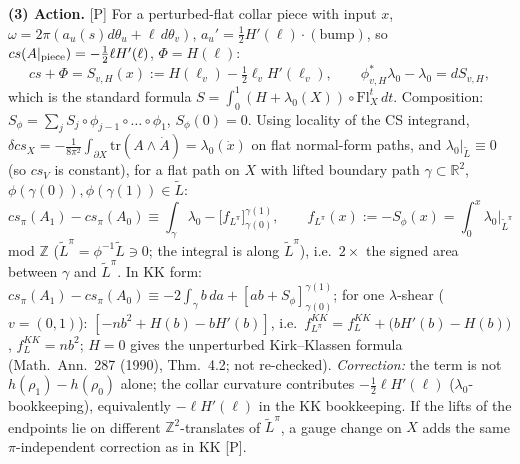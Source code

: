 \smallskip\noindent\textbf{(3) Action.} [P] For a perturbed-flat collar piece with input $x$,
$\omega=2\pi(a_u(s)d\theta_u+\ell\,d\theta_v)$, $a_u'=\frac12H'(\ell)\cdot(\text{bump})$, so
$cs(A|_{\rm piece})=-\frac12\ell H'(\ell)$, $\Phi=H(\ell)$:
\begin{equation}\label{collar:S}
cs+\Phi=S_{v,H}(x):=H(\ell_v)-\tfrac12\ell_vH'(\ell_v),\qquad \phi_{v,H}^*\lambda_0-\lambda_0=dS_{v,H},
\end{equation}
which is the standard formula $S=\int_0^1(H+\lambda_0(X))\circ\mathrm{Fl}^t_X\,dt$. Composition:
$S_\phi=\sum_jS_j\circ\phi_{j-1}\circ\dots\circ\phi_1$, $S_\phi(0)=0$. Using locality of the CS integrand,
$\delta cs_X=-\frac1{8\pi^2}\int_{\partial X}\mathrm{tr}(A\wedge\dot A)=\lambda_0(\dot x)$ on flat normal-form paths, and
$\lambda_0|_{\tilde L}\equiv0$ (so $cs_V$ is constant), for a flat path on $X$ with lifted boundary path
$\gamma\subset\mathbb R^2$, $\phi(\gamma(0)),\phi(\gamma(1))\in\tilde L$:
\begin{equation}\label{collar:action}
cs_\pi(A_1)-cs_\pi(A_0)\equiv\int_\gamma\lambda_0-\bigl[f_{L^\pi}\bigr]_{\gamma(0)}^{\gamma(1)},\qquad
f_{L^\pi}(x):=-S_\phi(x)=\int_{0}^{x}\lambda_0\big|_{\tilde L^\pi}
\end{equation}
mod $\mathbb Z$ ($\tilde L^\pi=\phi^{-1}\tilde L\ni0$; the integral is along $\tilde L^\pi$), i.e.\ $2\times$ the signed area between $\gamma$ and $\tilde L^\pi$. In KK form:
$cs_\pi(A_1)-cs_\pi(A_0)\equiv-2\int_\gamma b\,da+[ab+S_\phi]_{\gamma(0)}^{\gamma(1)}$; for one $\lambda$-shear ($v=(0,1)$):
$[-nb^2+H(b)-bH'(b)]$, i.e.\ $f^{KK}_{L^\pi}=f^{KK}_L+\bigl(bH'(b)-H(b)\bigr)$, $f^{KK}_L=nb^2$; $H=0$ gives
the unperturbed Kirk--Klassen formula (Math.\ Ann.\ 287 (1990), Thm.~4.2; not re-checked). \emph{Correction:} the
term is not $h(\rho_1)-h(\rho_0)$ alone; the collar curvature contributes $-\frac12\ell H'(\ell)$ ($\lambda_0$-bookkeeping),
equivalently $-\ell H'(\ell)$ in the KK bookkeeping. If the lifts of the endpoints lie on different
$\mathbb Z^2$-translates of $\tilde L^\pi$, a gauge change on $X$ adds the same $\pi$-independent correction as in KK [P].

